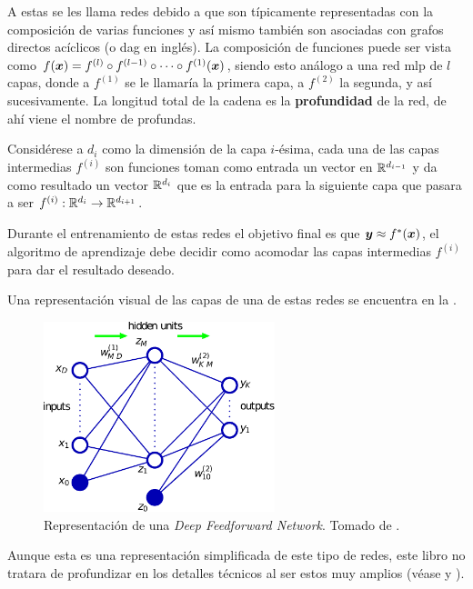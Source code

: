 A estas se les llama redes debido a que son típicamente representadas con la composición de varias funciones y así mismo también son asociadas con grafos directos acíclicos (o \gls{dag} en inglés). La composición de funciones puede ser vista como $f({\bm{x}}) = f^{(l)} \circ f^{(l-1)} \circ \cdots \circ f^{(1)}({\bm{x}})$, siendo esto análogo a una red \gls{mlp} de $l$ capas, donde a $f^{(1)}$ se le llamaría la primera capa, a $f^{(2)}$ la segunda, y así sucesivamente. La longitud total de la cadena es la \textbf{profundidad} de la red, de ahí viene el nombre de profundas.

Considérese a $d_i$ como la dimensión de la capa $i$-\'esima, cada una de las capas intermedias $f^{(i)}$ son funciones toman como entrada un vector en $\mathbb{R}^{d_{i-1}}$ y da como resultado un vector $\mathbb{R}^{d_{i}}$ que es la entrada para la siguiente capa que pasara a ser $f^{(i)}: \mathbb{R}^{d_{i}} \rightarrow \mathbb{R}^{d_{i+1}}$.

Durante el entrenamiento de estas redes el objetivo final es que ${\bm{y}} \approx f^{\ast}({\bm{x}})$, el algoritmo de aprendizaje debe decidir como acomodar las capas intermedias $f^{(i)}$ para dar el resultado deseado.

Una representación visual de las capas de una de estas redes se encuentra en la .

\begin{figure}[H]
\centering
\includegraphics[width=0.6\textwidth]{Figures/deep-feedforward-network.pdf}
\decoRule
\caption[Representación de una \textsl{Deep Feedforward Network}]{Representación de una \textsl{Deep Feedforward Network}. Tomado de \cite{bishop-pattern-recognition}.}
\label{fig:deep-feedforward-network}
\end{figure}

Aunque esta es una representación simplificada de este tipo de redes, este libro no tratara de profundizar en los detalles técnicos al ser estos muy amplios (véase \cite{deeplearning} y \cite{bishop-pattern-recognition}).

